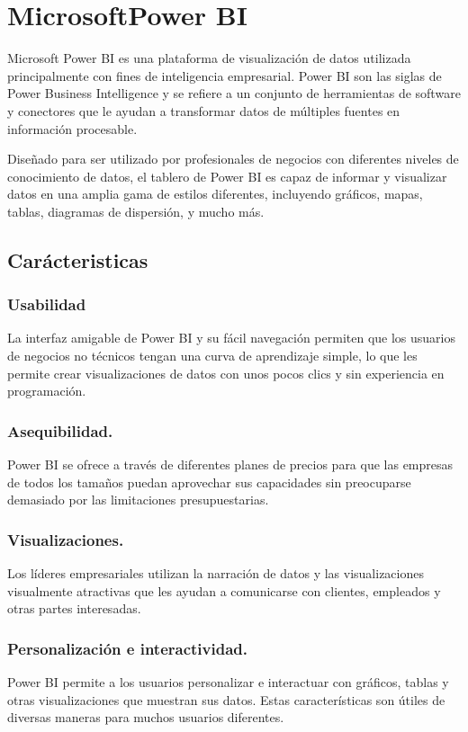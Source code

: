 \section{MicrosoftPower BI}
Microsoft Power BI es una plataforma de visualización de datos utilizada principalmente con fines 
de inteligencia empresarial. Power BI son las siglas de Power Business Intelligence y se refiere a 
un conjunto de herramientas de software y conectores que le ayudan a transformar datos de múltiples 
fuentes en información procesable.

Diseñado para ser utilizado por profesionales de negocios con diferentes niveles de conocimiento de 
datos, el tablero de Power BI es capaz de informar y visualizar datos en una amplia gama de estilos 
diferentes, incluyendo gráficos, mapas, tablas, diagramas de dispersión, y mucho más. \cite{power-bi-visualization} 


\subsection{Carácteristicas}

\subsubsection{Usabilidad}
La interfaz amigable de Power BI y su fácil navegación permiten que los usuarios de negocios no técnicos 
tengan una curva de aprendizaje simple, lo que les permite crear visualizaciones de datos con unos pocos clics y sin experiencia en programación.

\subsubsection{Asequibilidad.} 
Power BI se ofrece a través de diferentes planes de precios para que las empresas de todos los tamaños 
puedan aprovechar sus capacidades sin preocuparse demasiado por las limitaciones presupuestarias.

\subsubsection{Visualizaciones.} 
Los líderes empresariales utilizan la narración de datos y las visualizaciones visualmente atractivas 
que les ayudan a comunicarse con clientes, empleados y otras partes interesadas.

\subsubsection{Personalización e interactividad.}
Power BI permite a los usuarios personalizar e interactuar con gráficos, tablas y otras 
visualizaciones que muestran sus datos. Estas características son útiles de diversas maneras para muchos usuarios diferentes. \cite{microsoft-power-bi}


